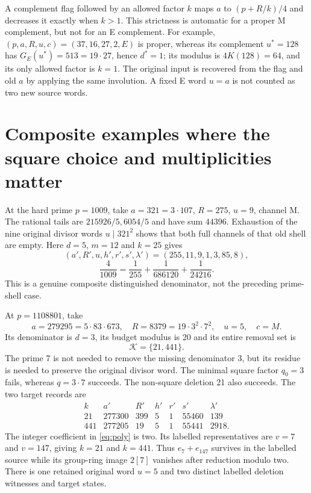 A complement flag followed by an allowed factor $k$ maps
$a$ to $(p+R/k)/4$ and decreases it exactly when $k>1$.  This strictness is
automatic for a proper M complement, but not for an E complement.  For example,
$(p,a,R,u,c)=(37,16,27,2,E)$ is proper, whereas its complement $u^*=128$
has $G_E(u^*)=513=19\cdot27$, hence $d^*=1$; its modulus is
$4K(128)=64$, and its only allowed factor is $k=1$.
The original input is recovered from the flag and old $a$ by applying the same
involution. A fixed E word $u=a$ is not counted as two new source words.

\section{Composite examples where the square choice and multiplicities matter}
At the hard prime $p=1009$, take $a=321=3\cdot107$, $R=275$, $u=9$, channel M.
The rational tails are $215926/5,6054/5$ and have sum $44396$.
Exhaustion of the nine original divisor words $u\mid321^2$ shows that both full
channels of that old shell are empty. Here $d=5$, $m=12$ and $k=25$ gives
\[
 (a',R',u,h',r',s',\lambda')=(255,11,9,1,3,85,8),
\]
\begin{equation}\label{eq:1009}
 \boxed{\frac4{1009}=\frac1{255}+\frac1{686120}+\frac1{24216}.}
\end{equation}
This is a genuine composite distinguished denominator, not the preceding
prime-shell case.

At $p=1108801$, take
\[
 a=279295=5\cdot83\cdot673,\quad R=8379=19\cdot3^2\cdot7^2,
 \quad u=5,\quad c=M.
\]
Its denominator is $d=3$, its budget modulus is 20 and its entire removal set is
\begin{equation}\label{eq:mixed}
 \boxed{\mathcal K=\{21,441\}.}
\end{equation}
The prime 7 is not needed to remove the missing denominator 3, but its residue
is needed to preserve the original divisor word. The minimal square factor
$q_0=3$ fails, whereas $q=3\cdot7$ succeeds. The non-square deletion 21 also
succeeds. The two target records are
\[
\begin{array}{c|rrrrrr}
 k&a'&R'&h'&r'&s'&\lambda'\\\hline
 21&277300&399&5&1&55460&139\\
 441&277205&19&5&1&55441&2918.
\end{array}
\]
The integer coefficient in \eqref{eq:poly} is two.  Its labelled representatives
are $v=7$ and $v=147$, giving $k=21$ and $k=441$.  Thus
$e_7+e_{147}$ survives in the labelled source while its group-ring image
$2[7]$ vanishes after reduction modulo two.  There is one retained original
word $u=5$ and two distinct labelled deletion witnesses and target states.


